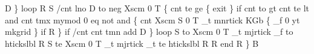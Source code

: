 \documentclass[11pt]{article}
\begin{document}
          D              %
         \} loop          %
      R                  %
      S                  %
        /cnt             %
          lno            %
        D                %
        to neg Xscm 0 T  %
        \{                %
          cnt te ge \{    %
            exit         %
          \} if           %
          cnt to gt      %
          cnt te lt      %
          and            %
          cnt tmx mymod  %
          0 eq not       %
          and \{          %
            cnt Xscm     %
            S            %
              0 T               %
              _t mnrtick        %
              KGb \{             %
                _f 0 yt mkgrid  %
              \} if              %
            R            %
          \} if           %
          /cnt           %
            cnt tmn add  %
          D              %
        \} loop           %
        S                %
          to Xscm 0 T    %
          _t mjrtick     %
          _f to htickslbl  %
        R                %
        S                %
          te Xscm 0 T    %
          _t mjrtick     %
          _t te htickslbl  %
        R                %
      R                  %
    end                  %
  R                      %
\} B                      %
\eatline
\end{document}
